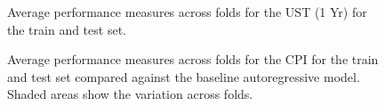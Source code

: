 \documentclass{article}
\theoremstyle{plain}
\theoremstyle{definition}
\theoremstyle{remark}
\begin{document}

\begin{figure}


\caption{\label{fig-ust-10}Average performance measures across folds for the UST (1 Yr) for the train and test set.}

\end{figure}%


\begin{figure}


\caption{\label{fig-cpi-b}Average performance measures across folds for the CPI for the train and test set compared against the baseline autoregressive model. Shaded areas show the variation across folds.}

\end{figure}%

\end{document}
